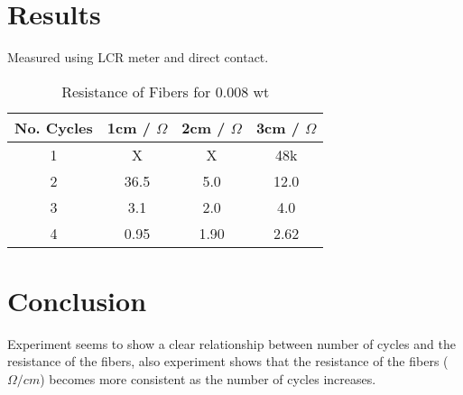 \documentclass{article}
\begin{document}
\pagebreak
\section{Results}
Measured using LCR meter and direct contact.
\begin{table}[h!]
\centering
\begin{tabular}{ |c|c|c|c| } 
    \hline
    No. Cycles &  1cm / $\Omega$ & 2cm / $\Omega$ & 3cm / $\Omega$  \\
    \hline
    1 & X & X & 48k \\
    2 & 36.5 & 5.0 & 12.0 \\
    3 & 3.1 & 2.0 & 4.0 \\
    4 & 0.95 & 1.90 & 2.62\\
    \hline
\end{tabular}
 \caption{Resistance of Fibers for 0.008 wt}
\label{table:1}
\end{table}

\section{Conclusion}
Experiment seems to show a clear relationship between number of cycles and the resistance of the fibers, also experiment shows that the resistance of the fibers ($\Omega/cm$) becomes more consistent as the number of cycles increases.
\end{document}
